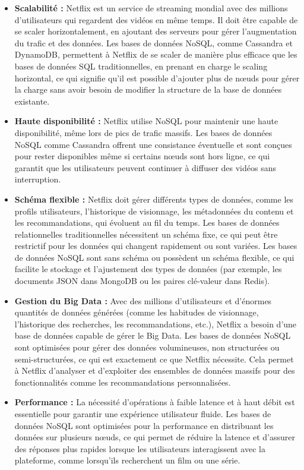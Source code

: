 \documentclass{article}
\begin{document}
\begin{itemize}
  \item \textbf{Scalabilité :} Netflix est un service de streaming mondial avec des millions d'utilisateurs qui regardent des vidéos en même temps. Il doit être capable de se scaler horizontalement, en ajoutant des serveurs pour gérer l'augmentation du trafic et des données. Les bases de données NoSQL, comme Cassandra et DynamoDB, permettent à Netflix de se scaler de manière plus efficace que les bases de données SQL traditionnelles, en prenant en charge le scaling horizontal, ce qui signifie qu'il est possible d'ajouter plus de nœuds pour gérer la charge sans avoir besoin de modifier la structure de la base de données existante.

  \item \textbf{Haute disponibilité :} Netflix utilise NoSQL pour maintenir une haute disponibilité, même lors de pics de trafic massifs. Les bases de données NoSQL comme Cassandra offrent une consistance éventuelle et sont conçues pour rester disponibles même si certains nœuds sont hors ligne, ce qui garantit que les utilisateurs peuvent continuer à diffuser des vidéos sans interruption.

  \item \textbf{Schéma flexible :} Netflix doit gérer différents types de données, comme les profils utilisateurs, l'historique de visionnage, les métadonnées du contenu et les recommandations, qui évoluent au fil du temps. Les bases de données relationnelles traditionnelles nécessitent un schéma fixe, ce qui peut être restrictif pour les données qui changent rapidement ou sont variées. Les bases de données NoSQL sont sans schéma ou possèdent un schéma flexible, ce qui facilite le stockage et l'ajustement des types de données (par exemple, les documents JSON dans MongoDB ou les paires clé-valeur dans Redis).

  \item \textbf{Gestion du Big Data :} Avec des millions d'utilisateurs et d'énormes quantités de données générées (comme les habitudes de visionnage, l'historique des recherches, les recommandations, etc.), Netflix a besoin d'une base de données capable de gérer le Big Data. Les bases de données NoSQL sont optimisées pour gérer des données volumineuses, non structurées ou semi-structurées, ce qui est exactement ce que Netflix nécessite. Cela permet à Netflix d'analyser et d'exploiter des ensembles de données massifs pour des fonctionnalités comme les recommandations personnalisées.

  \item \textbf{Performance :} La nécessité d'opérations à faible latence et à haut débit est essentielle pour garantir une expérience utilisateur fluide. Les bases de données NoSQL sont optimisées pour la performance en distribuant les données sur plusieurs nœuds, ce qui permet de réduire la latence et d'assurer des réponses plus rapides lorsque les utilisateurs interagissent avec la plateforme, comme lorsqu'ils recherchent un film ou une série.
\end{itemize}
\end{document}
